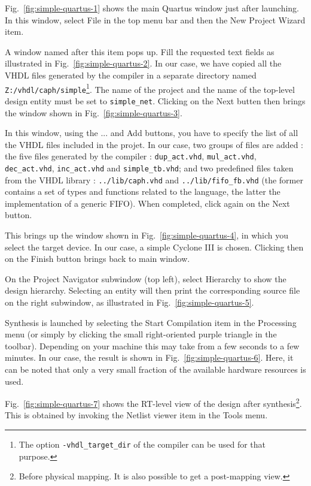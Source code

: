 Fig.~\ref{fig:simple-quartus-1} shows the
main Quartus window just after launching. In this window, select \textsf{File} in the top menu bar and
then the \textsf{New Project Wizard} item.

A window named after this item pops up. Fill the requested text
fields as illustrated in Fig.~\ref{fig:simple-quartus-2}. In our case, we have copied all the VHDL
files generated by the \caph compiler in a separate directory named
\verb|Z:/vhdl/caph/simple|\footnote{The option \texttt{-vhdl\_target\_dir} of the compiler can be
  used for that purpose.}. The
name of the project and the name of the top-level design entity must be set to
\verb|simple_net|. Clicking on the \textsf{Next} butten then brings the window shown in
Fig.~\ref{fig:simple-quartus-3}.

In this window, using the \textsf{...} and \textsf{Add} buttons, you have to specify the list of all the
VHDL files included in the projet. In our case, two groups of files are added : the five files
generated by the \caph compiler : \verb|dup_act.vhd|, \verb|mul_act.vhd|, \verb|dec_act.vhd|,
  \verb|inc_act.vhd| and \verb|simple_tb.vhd|; and two predefined files taken from the \caph VHDL
  library : \verb|../lib/caph.vhd| and \verb|../lib/fifo_fb.vhd| (the former contains a set of types
  and functions related to the \caph language, the latter the implementation of a generic
  FIFO). When completed, click again on the \textsf{Next} button.

  This brings up the window shown in Fig.~\ref{fig:simple-quartus-4}, in which you select the target
  device. In our case, a simple Cyclone III is chosen. Clicking then on the \textsf{Finish} button
  brings back to main window.

  On the \textsf{Project Navigator} subwindow (top left), select \textsf{Hierarchy} to show the design
  hierarchy. Selecting an entity will then print the corresponding source file on the right
  subwindow, as illustrated in Fig.~\ref{fig:simple-quartus-5}.

Synthesis is launched by selecting the \textsf{Start Compilation} item in the \textsf{Processing} menu
(or simply by clicking the small right-oriented purple triangle in the toolbar). Depending on your
machine this may take from a few seconds to a few minutes. In our case, the result is shown in
Fig.~\ref{fig:simple-quartus-6}. Here, it can be noted that only a very small fraction of the
available hardware resources is used.  

Fig.~\ref{fig:simple-quartus-7} shows the RT-level view of the design after
synthesis\footnote{Before physical mapping. It is also possible to get a post-mapping view.}. This
is obtained by invoking the \textsf{Netlist viewer} item in the \textsf{Tools} menu.

